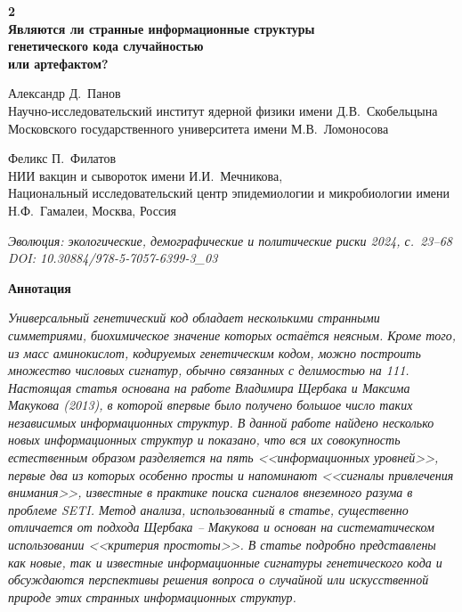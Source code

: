 \documentclass[12pt]{article}
\begin{document}
\begin{center}
{\Large\bfseries 2}\\[0.5em]
{\Large\bfseries Являются ли странные информационные структуры\\
генетического кода случайностью\\
или артефактом?}

\vspace{1em}

{\large Александр Д.\ Панов}\\[0.3em]
{\small Научно-исследовательский институт ядерной физики имени Д.В.~Скобельцына Московского государственного университета имени М.В.~Ломоносова}

\vspace{0.5em}

{\large Феликс П.\ Филатов}\\[0.3em]
{\small НИИ вакцин и сывороток имени И.И.~Мечникова,\\
Национальный исследовательский центр эпидемиологии и микробиологии имени Н.Ф.~Гамалеи, Москва, Россия}

\vspace{0.5em}

{\small\itshape Эволюция: экологические, демографические и политические риски 2024, с.\ 23--68\\
DOI: 10.30884/978-5-7057-6399-3\_03}
\end{center}

\vspace{2em}

\noindent\textbf{Аннотация}

\noindent\textit{Универсальный генетический код обладает несколькими странными симметриями, биохимическое значение которых остаётся неясным. Кроме того, из масс аминокислот, кодируемых генетическим кодом, можно построить множество числовых сигнатур, обычно связанных с делимостью на 111. Настоящая статья основана на работе Владимира Щербака и Максима Макукова (2013), в которой впервые было получено большое число таких независимых информационных структур. В данной работе найдено несколько новых информационных структур и показано, что вся их совокупность естественным образом разделяется на пять <<информационных уровней>>, первые два из которых особенно просты и напоминают <<сигналы привлечения внимания>>, известные в практике поиска сигналов внеземного разума в проблеме SETI. Метод анализа, использованный в статье, существенно отличается от подхода Щербака -- Макукова и основан на систематическом использовании <<критерия простоты>>. В статье подробно представлены как новые, так и известные информационные сигнатуры генетического кода и обсуждаются перспективы решения вопроса о случайной или искусственной природе этих странных информационных структур.}
\end{document}
